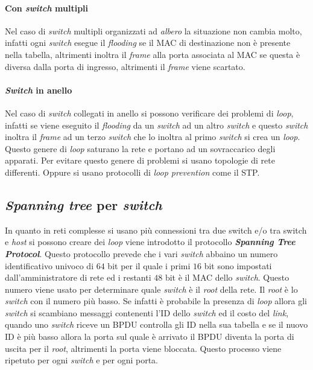         \paragraph{Con \textit{switch} multipli} Nel caso di \textit{switch} multipli organizzati ad \textit{albero} la situazione non cambia molto, infatti ogni \textit{switch} esegue il \textit{flooding} se il \Acrshort*{MAC} di destinazione non è presente nella tabella, altrimenti inoltra il \textit{frame} alla porta associata al \Acrshort*{MAC} se questa è diversa dalla porta di ingresso, altrimenti il \textit{frame} viene scartato.
        \paragraph{\textit{Switch} in anello} Nel caso di \textit{switch} collegati in anello si possono verificare dei problemi di \textit{loop}, infatti se viene eseguito il \textit{flooding} da un \textit{switch} ad un altro \textit{switch} e questo \textit{switch} inoltra il \textit{frame} ad un terzo \textit{switch} che lo inoltra al primo \textit{switch} si crea un \textit{loop}. Questo genere di \textit{loop} saturano la rete e portano ad un sovraccarico degli apparati. Per evitare questo genere di problemi si usano topologie di rete differenti. Oppure si usano protocolli di \textit{loop prevention} come il \acrfull*{STP}.
    \subsection{\textit{Spanning tree} per \textit{switch}}
        In quanto in reti complesse si usano più connessioni tra due switch e/o tra switch e \textit{host} si possono creare dei \textit{loop} viene introdotto il protocollo \textbf{\textit{Spanning Tree Protocol}}. Questo protocollo prevede che i vari \textit{switch} abbaino un numero identificativo univoco di $64$ bit per il quale i primi $16$ bit sono impostati dall'amministratore di rete ed i restanti $48$ bit è il \Acrshort*{MAC} dello \textit{switch}. Questo numero viene usato per determinare quale \textit{switch} è il \textit{root} della rete. Il \textit{root} è lo \textit{switch} con il numero più basso.\newline
        Se infatti è probabile la presenza di \textit{loop} allora gli \textit{switch} si scambiano messaggi contenenti l'\Acrshort*{ID} dello \textit{switch} ed il costo del \textit{link}, quando uno \textit{switch} riceve un \acrfull*{BPDU} controlla gli \Acrshort*{ID} nella sua tabella e se il nuovo \Acrshort*{ID} è più basso allora la porta sul quale è arrivato il \Acrshort*{BPDU} diventa la porta di uscita per il \textit{root}, altrimenti la porta viene bloccata. Questo processo viene ripetuto per ogni \textit{switch} e per ogni porta.
